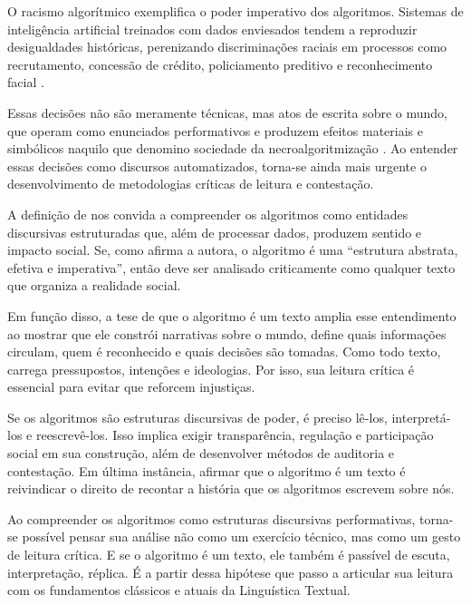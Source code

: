 \documentclass[portuguese]{textolivre}
\begin{document}
O racismo algorítmico exemplifica o poder imperativo dos algoritmos. Sistemas de inteligência artificial treinados com dados enviesados tendem a reproduzir desigualdades históricas, perenizando discriminações raciais em processos como recrutamento, concessão de crédito, policiamento preditivo e reconhecimento facial \cite{silva2022}.

Essas decisões não são meramente técnicas, mas atos de escrita sobre o mundo, que operam como enunciados performativos e produzem efeitos materiais e simbólicos naquilo que denomino sociedade da necroalgoritmização \cite{araujo2025_necroalgoritmizacao}. Ao entender essas decisões como discursos automatizados, torna-se ainda mais urgente o desenvolvimento de metodologias críticas de leitura e contestação.

A definição de \textcite{hill2016} nos convida a compreender os algoritmos como entidades discursivas estruturadas que, além de processar dados, produzem sentido e impacto social. Se, como afirma a autora, o algoritmo é uma “estrutura abstrata, efetiva e imperativa”, então deve ser analisado criticamente como qualquer texto que organiza a realidade social.

Em função disso, a tese de que o algoritmo é um texto amplia esse entendimento ao mostrar que ele constrói narrativas sobre o mundo, define quais informações circulam, quem é reconhecido e quais decisões são tomadas. Como todo texto, carrega pressupostos, intenções e ideologias. Por isso, sua leitura crítica é essencial para evitar que reforcem injustiças.

Se os algoritmos são estruturas discursivas de poder, é preciso lê-los, interpretá-los e reescrevê-los. Isso implica exigir transparência, regulação e participação social em sua construção, além de desenvolver métodos de auditoria e contestação. Em última instância, afirmar que o algoritmo é um texto é reivindicar o direito de recontar a história que os algoritmos escrevem sobre nós.

Ao compreender os algoritmos como estruturas discursivas performativas, torna-se possível pensar sua análise não como um exercício técnico, mas como um gesto de leitura crítica. E se o algoritmo é um texto, ele também é passível de escuta, interpretação, réplica. É a partir dessa hipótese que passo a articular sua leitura com os fundamentos clássicos e atuais da Linguística Textual.
\end{document}
